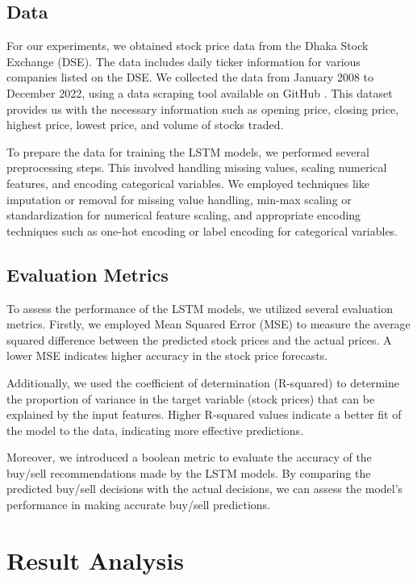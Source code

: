 \documentclass[conference]{IEEEtran}
\begin{document}
\subsection{Data}

For our experiments, we obtained stock price data from the Dhaka Stock Exchange (DSE). The data includes daily ticker information for various companies listed on the DSE. We collected the data from January 2008 to December 2022, using a data scraping tool available on GitHub \cite{bdstockexchange}. This dataset provides us with the necessary information such as opening price, closing price, highest price, lowest price, and volume of stocks traded.

To prepare the data for training the LSTM models, we performed several preprocessing steps. This involved handling missing values, scaling numerical features, and encoding categorical variables. We employed techniques like imputation or removal for missing value handling, min-max scaling or standardization for numerical feature scaling, and appropriate encoding techniques such as one-hot encoding or label encoding for categorical variables.

\subsection{Evaluation Metrics}

To assess the performance of the LSTM models, we utilized several evaluation metrics. Firstly, we employed Mean Squared Error (MSE) to measure the average squared difference between the predicted stock prices and the actual prices. A lower MSE indicates higher accuracy in the stock price forecasts.

Additionally, we used the coefficient of determination (R-squared) to determine the proportion of variance in the target variable (stock prices) that can be explained by the input features. Higher R-squared values indicate a better fit of the model to the data, indicating more effective predictions.

Moreover, we introduced a boolean metric to evaluate the accuracy of the buy/sell recommendations made by the LSTM models. By comparing the predicted buy/sell decisions with the actual decisions, we can assess the model's performance in making accurate buy/sell predictions.




\section{Result Analysis}
\end{document}

